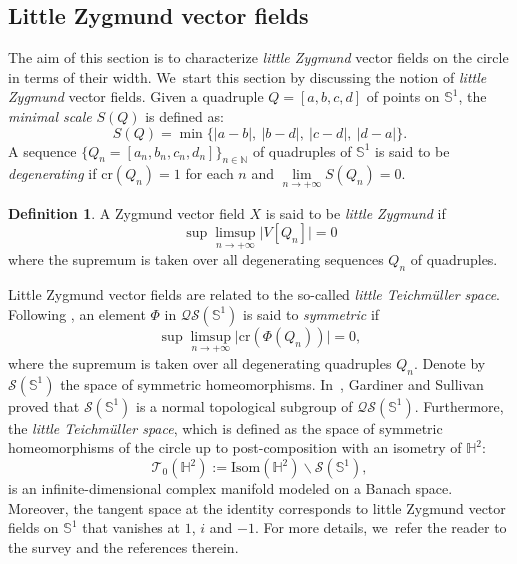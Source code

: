\documentclass[JEP,XML,SOM,Unicode,NoEqCountersInSection, NoFloatCountersInSection,published]{cedram}
\theoremstyle{plain}
\theoremstyle{definition}
\newtheorem{defi}[cor]{Definition}
\begin{document}
\subsection{Little Zygmund vector fields}
The aim of this section is to characterize \emph{little Zygmund} vector fields on the circle in terms of their width. We~start this section by discussing the notion of \emph{little Zygmund} vector fields. Given a quadruple $Q=[a,b,c,d]$ of points on $\mathbb{S}^1$, the \emph{minimal scale} $S(Q)$ is defined as:
\[
S(Q)=\min\{\lvert a-b\rvert, \ \lvert b-d\rvert,\ \lvert c-d\rvert, \ \lvert d-a\rvert \}.
\]
A sequence $ \{Q_n = [a_n, b_n, c_n, d_n]\}_{n\in\mathbb{N}}$ of quadruples of $\mathbb{S}^1$ is said to be \emph{degenerating} if $\mathrm{cr}(Q_n)=1$ for each $n$ and $\lim\limits_{n \rightarrow +\infty} S(Q_n)=0$.
\begin{defi}
A Zygmund vector field $X$ is said to be \emph{little Zygmund} if
\[
\sup\limsup\limits_{n \rightarrow +\infty} \lvert V[Q_n]\rvert=0
\]
where the supremum is taken over all degenerating sequences $Q_n$ of quadruples.
\end{defi}
Little Zygmund vector fields are related to the so-called \emph{little Teichmüller space}. Following \cite{Fan_Hu_Little}, an element $\Phi$ in $\mathcal{QS}(\mathbb{S}^1)$ is said to \emph{symmetric} if
\[
\sup\limsup\limits_{n \rightarrow +\infty} \lvert \mathrm{cr}(\Phi(Q_n))\rvert=0,
\]
where the supremum is taken over all degenerating quadruples $Q_n$. Denote by $\mathcal{S}(\mathbb{S}^1)$ the space of symmetric homeomorphisms. In~\cite{Gardiner_Sullivan}, Gardiner and Sullivan proved that $\mathcal{S}(\mathbb{S}^1)$ is a normal topological subgroup of $\mathcal{QS}(\mathbb{S}^1)$. Furthermore, the \emph{little Teichmüller space}, which is defined as the space of symmetric homeomorphisms of the circle up to post-composition with an isometry of $\mathbb{H}^2$:
\[
\mathcal{T}_0(\mathbb{H}^2):=\mathrm{Isom}(\mathbb{H}^2)\backslash \mathcal{S}(\mathbb{S}^1),
\]
is an infinite-dimensional complex manifold modeled on a Banach space. Moreover, the tangent space at the identity corresponds to little Zygmund vector fields on $\mathbb{S}^1$ that vanishes at $1$, $i$ and $-1$. For more details, we~refer the reader to the survey \cite{HU_Survey} and the references therein.
\end{document}
